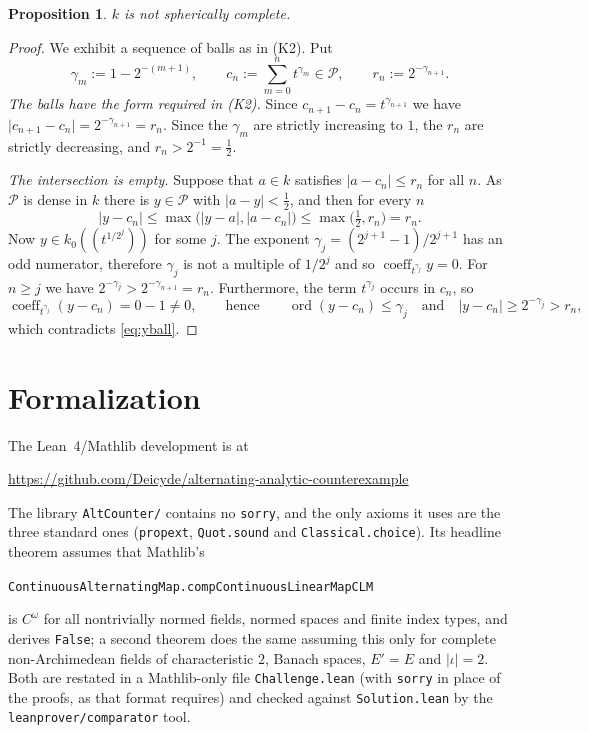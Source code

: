\documentclass[11pt]{amsart}
\newtheorem{proposition}[theorem]{Proposition}
\theoremstyle{remark}
\newcommand{\kk}{k}
\newcommand{\cP}{\mathcal{P}}
\newcommand{\coeff}{\operatorname{coeff}}
\newcommand{\abs}[1]{\lvert #1\rvert}
\newcommand{\1}{\mathbf{1}}
\begin{document}
\begin{proposition}\label{prop:field}
$\kk$ is not spherically complete.
\end{proposition}
\begin{proof}
We exhibit a sequence of balls as in (K2). Put
\[
\gamma_m:=1-2^{-(m+1)},\qquad
c_n:=\sum_{m=0}^{n}t^{\gamma_m}\in\cP,\qquad r_n:=2^{-\gamma_{n+1}} .
\]
\emph{The balls have the form required in \textup{(K2)}.} Since $c_{n+1}-c_n=t^{\gamma_{n+1}}$ we have
$\abs{c_{n+1}-c_n}=2^{-\gamma_{n+1}}=r_n$. Since the $\gamma_m$ are strictly increasing to $1$, the $r_n$ are strictly decreasing, and $r_n>2^{-1}=\tfrac12$.

\emph{The intersection is empty.} Suppose that $a\in\kk$ satisfies $\abs{a-c_n}\le r_n$ for all $n$. As $\cP$ is dense in $\kk$
there is $y\in\cP$ with $\abs{a-y}<\tfrac12$, and then for every $n$
\begin{equation}\label{eq:yball}
\abs{y-c_n}\le\max\bigl(\abs{y-a},\abs{a-c_n}\bigr)\le\max\bigl(\tfrac12,r_n\bigr)=r_n .
\end{equation}
Now $y\in k_0((t^{1/2^j}))$ for some $j$. The exponent
$\gamma_j=(2^{j+1}-1)/2^{j+1}$ has an odd numerator, therefore $\gamma_j$ is not a multiple of $1/2^j$ and so $\coeff_{t^{\gamma_j}}y=0$. For $n\ge j$ we have
$2^{-\gamma_j}>2^{-\gamma_{n+1}}=r_n$. Furthermore, the term $t^{\gamma_j}$ occurs in $c_n$, so
\[
\coeff_{t^{\gamma_j}}(y-c_n)=0-1\ne0,\qquad\text{hence}\qquad \operatorname{ord}(y-c_n)\le\gamma_j
\quad\text{and}\quad \abs{y-c_n}\ge2^{-\gamma_j}>r_n,
\]
which contradicts \eqref{eq:yball}.
\end{proof}

\section{Formalization}\label{sec:lean}
The Lean~4/Mathlib development is at
\begin{center}\url{https://github.com/Deicyde/alternating-analytic-counterexample}\end{center}
The library \texttt{AltCounter/} contains no \texttt{sorry}, and the only axioms it uses are the three standard ones
(\texttt{propext}, \texttt{Quot.sound} and \texttt{Classical.choice}). Its headline theorem assumes that Mathlib's
\begin{center}\texttt{ContinuousAlternatingMap.compContinuousLinearMapCLM}\end{center}
is $C^\omega$ for all nontrivially normed fields, normed spaces and finite index types, and derives \texttt{False}; a second
theorem does the same assuming this only for complete non-Archimedean fields of characteristic $2$, Banach spaces,
$E'=E$ and $\abs\iota=2$. Both are restated in a Mathlib-only file
\texttt{Challenge.lean} (with \texttt{sorry} in place of the proofs, as that format requires) and checked against
\texttt{Solution.lean} by the \texttt{leanprover/comparator} tool.
\end{document}
